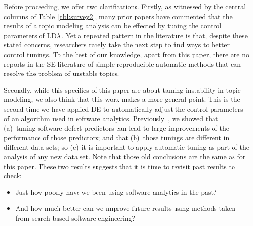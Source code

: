 \documentclass[10pt,conference]{IEEEtran}
\newcommand{\bi}{\begin{itemize}}
\newcommand{\ei}{\end{itemize}}
\theoremstyle{break}
\begin{document}
Before proceeding, we offer two clarifications.
Firstly, as
witnessed by the central columns of Table~\ref{tbl:survey2},
many prior papers have
commented that the results of a topic modeling analysis can be effected by
tuning the control parameters of LDA.  Yet a repeated pattern in the literature
is that, despite these stated concerns,
researchers rarely take the next step
to find ways to better control tunings.
To the best of our knowledge, apart from this paper, there are no reports in the SE literature
of simple reproducible automatic methods that can resolve the problem of unstable topics.

Secondly, while this specifics of this paper are about taming instability in topic modeling,
we also think that this work makes a more general point.
      This is the second time we have applied DE to automatically
      adjust the control parameters of an algorithm
      used in software analytics. Previously~\cite{fu2016tuning},
      we showed  that (a)~tuning software defect predictors can lead to large improvements of the performance
      of those predictors; and that (b)~those tunings are different in different data sets; so (c)~it is important to apply
      automatic tuning as part of the analysis of any new data set. Note that those old conclusions are the same
      as for this paper. These two results suggests that it is time to revisit
      past results to check:
      \bi
    \item
       Just
      how poorly have we been using software analytics
      in the past?
    \item
      And how much better can we improve future results using methods taken from search-based
      software engineering?
      \ei





\end{document}
